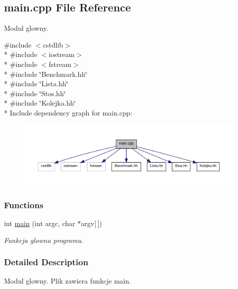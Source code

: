 \hypertarget{a00011}{\subsection{main.\-cpp File Reference}
\label{a00011}
}


Modul glowny.  


{\ttfamily \#include $<$cstdlib$>$}\\*
{\ttfamily \#include $<$iostream$>$}\\*
{\ttfamily \#include $<$fstream$>$}\\*
{\ttfamily \#include \char`\"{}Benchmark.\-hh\char`\"{}}\\*
{\ttfamily \#include \char`\"{}Lista.\-hh\char`\"{}}\\*
{\ttfamily \#include \char`\"{}Stos.\-hh\char`\"{}}\\*
{\ttfamily \#include \char`\"{}Kolejka.\-hh\char`\"{}}\\*
Include dependency graph for main.\-cpp\-:\nopagebreak
\begin{figure}[H]
\begin{center}
\leavevmode
\includegraphics[width=350pt]{a00022}
\end{center}
\end{figure}
\subsubsection*{Functions}
\begin{DoxyCompactItemize}
\item 
int \hyperlink{a00011_a0ddf1224851353fc92bfbff6f499fa97}{main} (int argc, char $\ast$argv\mbox{[}$\,$\mbox{]})
\begin{DoxyCompactList}\small\item\em Funkcja glowna programu. \end{DoxyCompactList}\end{DoxyCompactItemize}


\subsubsection{Detailed Description}
Modul glowny. Plik zawiera funkcje main. 

